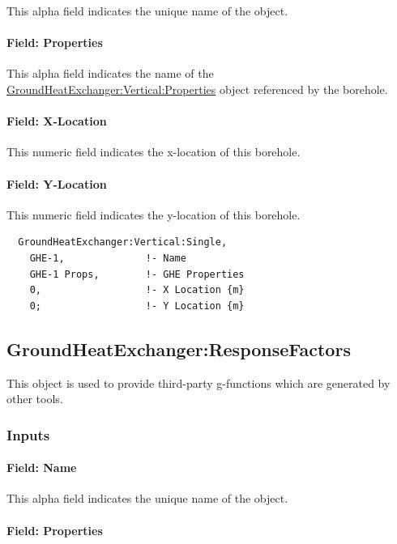 This alpha field indicates the unique name of the object.

\paragraph{Field: Properties}

This alpha field indicates the name of the \hyperref[groundheatexchangerverticalproperties]{GroundHeatExchanger:Vertical:Properties} object referenced by the borehole.

\paragraph{Field: X-Location}

This numeric field indicates the x-location of this borehole.

\paragraph{Field: Y-Location}

This numeric field indicates the y-location of this borehole.

\begin{lstlisting}
  GroundHeatExchanger:Vertical:Single,
    GHE-1,              !- Name
    GHE-1 Props,        !- GHE Properties
    0,                  !- X Location {m}
    0;                  !- Y Location {m}
\end{lstlisting}

\subsection{GroundHeatExchanger:ResponseFactors}\label{groundheatexchangerresponsefactors}

This object is used to provide third-party g-functions which are generated by other tools.

\subsubsection{Inputs}

\paragraph{Field: Name}

This alpha field indicates the unique name of the object.

\paragraph{Field: Properties}

